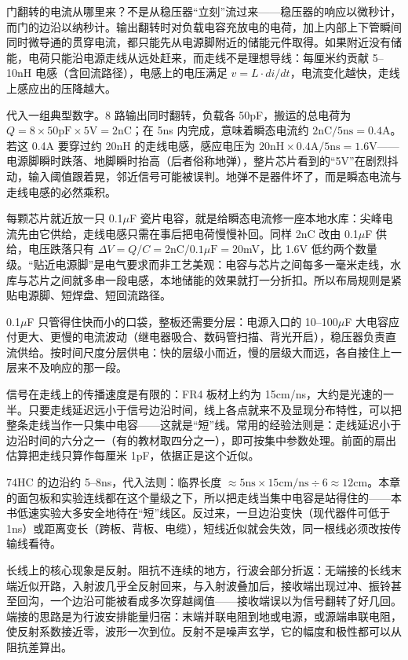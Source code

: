 门翻转的电流从哪里来？不是从稳压器“立刻”流过来——稳压器的响应以微秒计，而门的边沿以纳秒计。输出翻转时对负载电容充放电的电荷，加上内部上下管瞬间同时微导通的贯穿电流，都只能先从电源脚附近的储能元件取得。如果附近没有储能，电荷只能沿电源走线从远处赶来，而走线不是理想导线：每厘米约贡献 5–10nH 电感（含回流路径），电感上的电压满足 $v=L\cdot di/dt$，电流变化越快，走线上感应出的压降越大。

代入一组典型数字。8 路输出同时翻转，负载各 50pF，搬运的总电荷为 $Q=8\times50\mathrm{pF}\times5\mathrm{V}=2$nC；在 5ns 内完成，意味着瞬态电流约 $2\mathrm{nC}/5\mathrm{ns}=0.4$A。若这 0.4A 要穿过约 20nH 的走线电感，感应电压为 $20\mathrm{nH}\times0.4\mathrm{A}/5\mathrm{ns}=1.6$V——电源脚瞬时跌落、地脚瞬时抬高（后者俗称地弹），整片芯片看到的“5V”在剧烈抖动，输入阈值跟着晃，邻近信号可能被误判。地弹不是器件坏了，而是瞬态电流与走线电感的必然乘积。

每颗芯片就近放一只 0.1$\mu$F 瓷片电容，就是给瞬态电流修一座本地水库：尖峰电流先由它供给，走线电感只需在事后把电荷慢慢补回。同样 2nC 改由 0.1$\mu$F 供给，电压跌落只有 $\Delta V=Q/C=2\mathrm{nC}/0.1\mu\mathrm{F}=20$mV，比 1.6V 低约两个数量级。“贴近电源脚”是电气要求而非工艺美观：电容与芯片之间每多一毫米走线，水库与芯片之间就多串一段电感，本地储能的效果就打一分折扣。所以布局规则是紧贴电源脚、短焊盘、短回流路径。

0.1$\mu$F 只管得住快而小的口袋，整板还需要分层：电源入口的 10–100$\mu$F 大电容应付更大、更慢的电流波动（继电器吸合、数码管扫描、背光开启），稳压器负责直流供给。按时间尺度分层供电：快的层级小而近，慢的层级大而远，各自接住上一层来不及响应的那一段。

信号在走线上的传播速度是有限的：FR4 板材上约为 15cm/ns，大约是光速的一半。只要走线延迟远小于信号边沿时间，线上各点就来不及显现分布特性，可以把整条走线当作一只集中电容——这就是“短”线。常用的经验法则是：走线延迟小于边沿时间的六分之一（有的教材取四分之一），即可按集中参数处理。前面的扇出估算把走线只算作每厘米 1pF，依据正是这个近似。

74HC 的边沿约 5–8ns，代入法则：临界长度 $\approx5\mathrm{ns}\times15\mathrm{cm/ns}\div6\approx12$cm。本章的面包板和实验连线都在这个量级之下，所以把走线当集中电容是站得住的——本书低速实验大多安全地待在“短”线区。反过来，一旦边沿变快（现代器件可低于 1ns）或距离变长（跨板、背板、电缆），短线近似就会失效，同一根线必须改按传输线看待。

长线上的核心现象是反射。阻抗不连续的地方，行波会部分折返：无端接的长线末端近似开路，入射波几乎全反射回来，与入射波叠加后，接收端出现过冲、振铃甚至回沟，一个边沿可能被看成多次穿越阈值——接收端误以为信号翻转了好几回。端接的思路是为行波安排能量归宿：末端并联电阻到地或电源，或源端串联电阻，使反射系数接近零，波形一次到位。反射不是噪声玄学，它的幅度和极性都可以从阻抗差算出。

